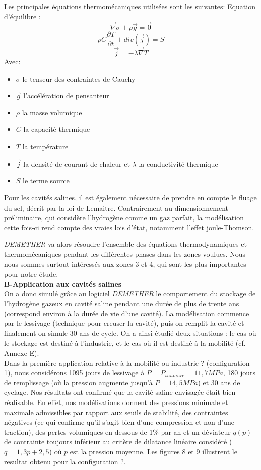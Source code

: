 \documentclass[11pt,french,a4paper]{article}
\begin{document}
Les principales équations thermomécaniques utilisées sont les suivantes:  
Equation d'équilibre : $$\vec{\nabla}\sigma + \rho \vec{g} = \vec{0}$$
$$\rho C \frac{\partial T}{\partial t} + div(\vec{j}) = S $$
$$\vec{j} = - \lambda \vec{\nabla}T $$
Avec:
\begin{itemize}
\item $\sigma$ le tenseur des contraintes de Cauchy
\item $\vec{g}$ l'accélération de pensanteur
\item $\rho$ la masse volumique
\item $C$ la capacité thermique 
\item $T$ la température
\item $\vec{j}$  la densité de courant de chaleur et $\lambda$ la conductivité thermique
\item $S$ le terme source
\end{itemize}

Pour les cavités salines, il est également nécessaire de prendre en compte le fluage du sel, décrit par la loi de Lemaitre. Contrairement au dimensionnement préliminaire, qui considère l'hydrogène comme un gaz parfait, la modélisation cette fois-ci rend compte des vraies lois d'état, notamment l'effet joule-Thomson. 

\emph{DEMETHER} va alors résoudre l’ensemble des équations thermodynamiques et thermomécaniques pendant les différentes phases dans les zones voulues. Nous nous sommes surtout intéressés aux zones 3 et 4, qui sont les plus importantes pour notre étude. \\

\textbf{B-Application aux cavités salines}\\

On a donc simulé grâce au logiciel \emph{DEMETHER} le comportement du stockage de l'hydrogène gazeux en cavité saline pendant une durée de plus de trente ans (correspond environ à la durée de vie d’une cavité). La modélisation commence par le lessivage (technique pour creuser la cavité), puis on remplit la cavité et finalement on simule 30 ans de cycle. On a ainsi étudié deux situations : le cas où le stockage est destiné à l’industrie, et le cas où il est destiné à la mobilité (cf. Annexe E). \\

Dans la première application relative à la mobilité ou industrie ? (configuration 1), nous considérons 1095 jours de lessivage à $P = P_{saumure} = 11,7 MPa$, 180 jours de remplissage (où la pression augmente jusqu’à $P = 14,5 MPa$) et 30 ans de cyclage. Nos résultats ont confirmé que la cavité saline envisagée était bien réalisable. En effet, nos modélisations donnent des pressions minimale et maximale admissibles par rapport aux seuils de stabilité, des contraintes négatives (ce qui confirme qu'il s'agit bien d'une compression et non d'une traction), des pertes volumiques en dessous de 1\% par an et un déviateur $q(p)$ de contrainte toujours inférieur au critère de dilatance linéaire considéré ($q = 1,3 p + 2,5$) où $p$ est la pression moyenne. Les figures 8 et 9 illustrent le resultat obtenu pour la configuration ?.\\
\end{document}
